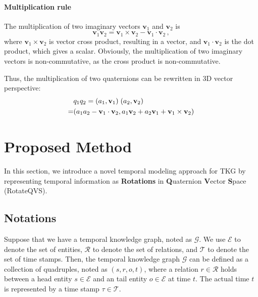\documentclass[11pt]{article}
\newcommand{\vect}[1]{\mathbf{#1}\xspace}
\begin{document}
\paragraph{Multiplication rule} The multiplication of two imaginary vectors $\vect{v}_1$ and $\vect{v}_2$ is
\begin{equation}\label{equation:vector_multiplication}
    \vect{v}_1 \vect{v}_2 = \vect{v}_1 \times \vect{v}_2 - \vect{v}_1 \cdot \vect{v}_2 \, ,
\end{equation}
where $\vect{v}_1 \times \vect{v}_2$ is vector cross product, resulting in a vector, and $\vect{v}_1 \cdot \vect{v}_2$ is the dot product, which gives a scalar.
Obviously, the multiplication of two imaginary vectors is non-commutative, as the cross product is non-commutative.

Thus, the multiplication of two quaternions can be rewritten in 3D vector perspective:
\begin{align}\label{equation:multiplication_3D}
    & q_1 q_2 = (a_1, \vect{v}_1)\hphantom{.} (a_2, \vect{v}_2) \nonumber\\
    = & (a_1a_2 - \vect{v}_1 \cdot \vect{v}_2, a_1\vect{v}_2 + a_2\vect{v}_1 + \vect{v}_1 \times \vect{v}_2 ) 
\end{align}






\section{Proposed Method}
\label{sec:our_method}
In this section, we introduce a novel temporal modeling approach for TKG by representing temporal information as \textbf{Rotations} in \textbf{Q}uaternion \textbf{V}ector \textbf{S}pace (RotateQVS).


\subsection{Notations}
Suppose that we have a temporal knowledge graph, noted as $\mathcal{G}$. We use $\mathcal{E}$ to denote the set of entities, $\mathcal{R}$ to denote the set of relations, and $\mathcal{T}$ to denote the set of time stamps.
Then, the temporal knowledge graph $\mathcal{G}$ can be defined as a collection of quadruples, noted as $(s, r, o, t)$, where a relation $r \in \mathcal{R}$ holds between a head entity $s\in \mathcal{E}$ and an tail entity $o\in \mathcal{E}$ at time $t$.
The actual time $t$ is represented by a time stamp $\tau \in \mathcal{T}$.
\end{document}
